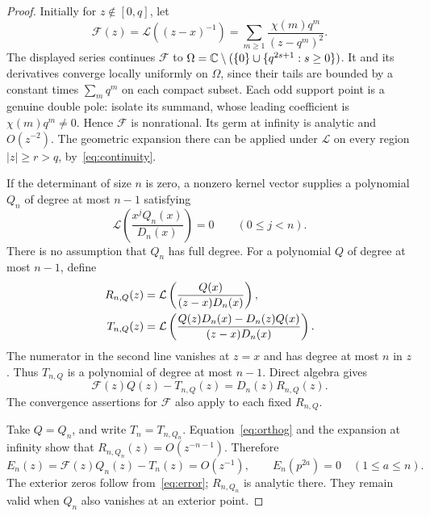 \documentclass[11pt,letterpaper]{article}
\numberwithin{equation}{section}
\theoremstyle{remark}\newtheorem{remark}[theorem]{Remark}
\newcommand{\Lcal}{\mathcal L}\newcommand{\Fcal}{\mathcal F}
\begin{document}
\begin{proof}
Initially for $z\notin[0,q]$, let
\begin{equation}\label{eq:transform}
 \Fcal(z)=\Lcal((z-x)^{-1})
 =\sum_{m\ge1}\frac{\chi(m)q^m}{(z-q^m)^2}.
\end{equation}
The displayed series continues $\Fcal$ to
$\Omega=\mathbb C\setminus(\{0\}\cup\{q^{2s+1}:s\ge0\})$. It and its derivatives converge locally uniformly on $\Omega$, since their tails are bounded by a constant times $\sum_m q^m$ on each compact subset. Each odd support point is a genuine double pole: isolate its summand, whose leading coefficient is $\chi(m)q^m\ne0$. Hence $\Fcal$ is nonrational. Its germ at infinity is analytic and $O(z^{-2})$. The geometric expansion there can be applied under $\Lcal$ on every region $|z|\ge r>q$, by~\eqref{eq:continuity}.

If the determinant of size $n$ is zero, a nonzero kernel vector supplies a polynomial $Q_n$ of degree at most $n-1$ satisfying
\begin{equation}\label{eq:orthog}
 \Lcal\left(\frac{x^jQ_n(x)}{D_n(x)}\right)=0\qquad(0\le j<n).
\end{equation}
There is no assumption that $Q_n$ has full degree. For a polynomial $Q$ of degree at most $n-1$, define
\begin{align}\label{eq:interpolants}
 R_{n,Q}(z)&=\Lcal\left(\frac{Q(x)}{(z-x)D_n(x)}\right),\notag\\
 T_{n,Q}(z)&=\Lcal\left(
 \frac{Q(z)D_n(x)-D_n(z)Q(x)}{(z-x)D_n(x)}\right).
\end{align}
The numerator in the second line vanishes at $z=x$ and has degree at most $n$ in $z$. Thus $T_{n,Q}$ is a polynomial of degree at most $n-1$. Direct algebra gives
\begin{equation}\label{eq:error}
 \Fcal(z)Q(z)-T_{n,Q}(z)=D_n(z)R_{n,Q}(z).
\end{equation}
The convergence assertions for $\Fcal$ also apply to each fixed $R_{n,Q}$.

Take $Q=Q_n$, and write $T_n=T_{n,Q_n}$. Equation~\eqref{eq:orthog} and the expansion at infinity show that $R_{n,Q_n}(z)=O(z^{-n-1})$. Therefore
\begin{equation}\label{eq:En}
 E_n(z)=\Fcal(z)Q_n(z)-T_n(z)=O(z^{-1}),\qquad
 E_n(p^{2a})=0\quad(1\le a\le n).
\end{equation}
The exterior zeros follow from~\eqref{eq:error}; $R_{n,Q_n}$ is analytic there. They remain valid when $Q_n$ also vanishes at an exterior point.


\end{proof}
\end{document}
